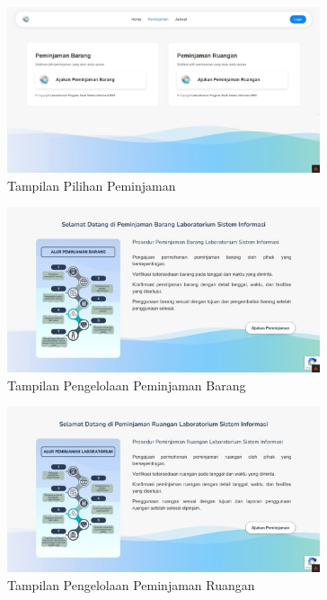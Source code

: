 \begin{figure}
	\centering
	\includegraphics[width=0.82\textwidth]{konten/gambar/perbaikan/pilih-peminjaman.jpeg}
	\caption{Tampilan Pilihan Peminjaman}
	\label{fig:pilih-peminjaman}
\end{figure}

\begin{figure}
	\centering
	\includegraphics[width=0.82\textwidth]{konten/gambar/perbaikan/peminjaman-barang.jpeg}
	\caption{Tampilan Pengelolaan Peminjaman Barang}
	\label{fig:peminjaman-barang}
\end{figure}

\begin{figure}
	\centering
	\includegraphics[width=0.82\textwidth]{konten/gambar/perbaikan/peminjaman-ruangan.jpeg}
	\caption{Tampilan Pengelolaan Peminjaman Ruangan}
	\label{fig:peminjaman-ruangan}
\end{figure}

